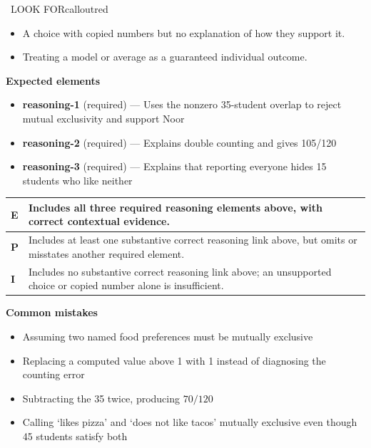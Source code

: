 \documentclass[11pt]{article}
\begin{document}
\begin{callout}{\IconWarn\ LOOK FOR}{calloutred}
\begin{itemize}[leftmargin=1.5em,itemsep=2pt,topsep=2pt]
  \item A choice with copied numbers but no explanation of how they support it.
  \item Treating a model or average as a guaranteed individual outcome.
\end{itemize}
\end{callout}


\textbf{Expected elements}
\begin{itemize}[leftmargin=1.5em,itemsep=2pt,topsep=2pt]
  \item \textbf{reasoning-1} (required) --- Uses the nonzero 35-student overlap to reject mutual exclusivity and support Noor
  \item \textbf{reasoning-2} (required) --- Explains double counting and gives 105/120
  \item \textbf{reasoning-3} (required) --- Explains that reporting everyone hides 15 students who like neither
\end{itemize}

{\small\renewcommand{\arraystretch}{1.25}
\noindent\begin{tabular}{|p{0.5in}|p{5.9in}|}
\hline
\textbf{E} & Includes all three required reasoning elements above, with correct contextual evidence. \\ \hline
\textbf{P} & Includes at least one substantive correct reasoning link above, but omits or misstates another required element. \\ \hline
\textbf{I} & Includes no substantive correct reasoning link above; an unsupported choice or copied number alone is insufficient. \\ \hline
\end{tabular}}

\textbf{Common mistakes}
\begin{itemize}[leftmargin=1.5em,itemsep=2pt,topsep=2pt]
  \item Assuming two named food preferences must be mutually exclusive
  \item Replacing a computed value above 1 with 1 instead of diagnosing the counting error
  \item Subtracting the 35 twice, producing $70/120$
  \item Calling `likes pizza' and `does not like tacos' mutually exclusive even though 45 students satisfy both
\end{itemize}
\end{document}
